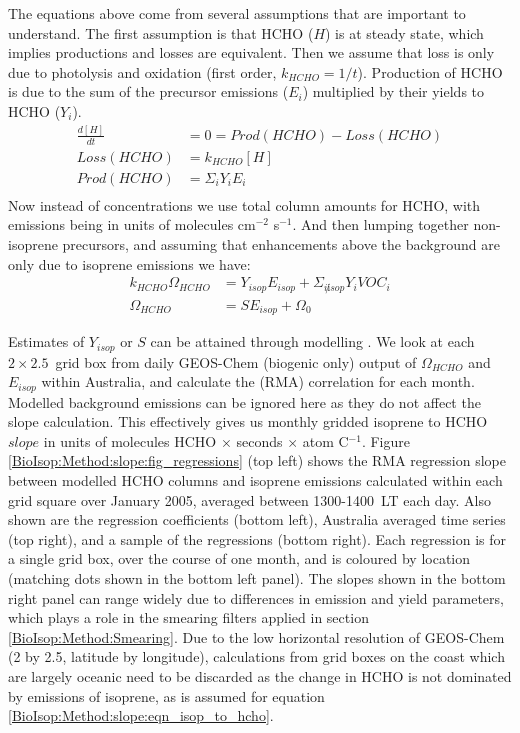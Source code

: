     The equations above come from several assumptions that are important to understand.
    The first assumption is that HCHO ($H$) %
    is at steady state, which implies productions and losses are equivalent.
    Then we assume that loss is only due to photolysis and oxidation (first order, $k_{HCHO} = 1/t$).
    Production of HCHO is due to the sum of the precursor emissions ($E_i$) multiplied by their yields to HCHO ($Y_i$).
    \begin{eqnarray*}
      \frac{d [ H ] }{dt} & = 0 = Prod(HCHO) - Loss(HCHO) \\
      Loss(HCHO)  & = k_{HCHO} [ H ] \\
      Prod(HCHO)  & = \Sigma_i Y_i E_i  \\
    \end{eqnarray*}
    Now instead of concentrations we use total column amounts for HCHO, with emissions being in units of molecules cm$^{-2}$ s$^{-1}$.
    And then lumping together non-isoprene precursors, and assuming that enhancements above the background are only due to isoprene emissions we have: 
    \begin{eqnarray*}
    k_{HCHO} \Omega_{HCHO} & = Y_{isop} E_{isop} + \Sigma_{i \not isop} Y_{i} VOC_{i} \\
    \Omega_{HCHO} & = S E_{isop} + \Omega_{0}
    \end{eqnarray*}
    
    
    Estimates of $Y_{isop}$ or $S$ can be attained through modelling \parencite[e.g.][]{Millet2006}.
    We look at each $2\times2.5$~\degr grid box from daily GEOS-Chem (biogenic only) output of $\Omega_{HCHO}$ and $E_{isop}$ within Australia, and calculate the (RMA) correlation for each month.
    Modelled background emissions can be ignored here as they do not affect the slope calculation.
    This effectively gives us monthly gridded isoprene to HCHO $slope$ in units of molecules HCHO $\times$ seconds $\times$ atom C$^{-1}$.
    Figure \ref{BioIsop:Method:slope:fig_regressions} (top left) shows the RMA regression slope between modelled HCHO columns and isoprene emissions calculated within each grid square over January 2005, averaged between 1300-1400~LT each day.
    Also shown are the regression coefficients (bottom left), Australia averaged time series (top right), and a sample of the regressions (bottom right).
    Each regression is for a single grid box, over the course of one month, and is coloured by location (matching dots shown in the bottom left panel).
    The slopes shown in the bottom right panel can range widely due to differences in emission and yield parameters, which plays a role in the smearing filters applied in section \ref{BioIsop:Method:Smearing}.
    Due to the low horizontal resolution of GEOS-Chem (2 by 2.5\degr, latitude by longitude), calculations from grid boxes on the coast which are largely oceanic need to be discarded as the change in HCHO is not dominated by emissions of isoprene, as is assumed for equation \ref{BioIsop:Method:slope:eqn_isop_to_hcho}.
    
